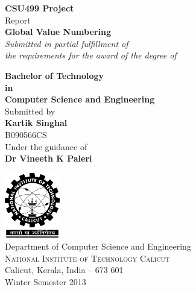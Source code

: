 \begin{titlepage}

\begin{center}

\textup{\small {\bf CSU499 Project} \\ Report}\\[0.4in]

\Large \textbf {Global Value Numbering}\\[0.5in]

       \small \emph{Submitted in partial fulfillment of\\
        the requirements for the award of the degree of}
        \vspace{.2in}

       {\bf Bachelor of Technology \\in\\ Computer Science and Engineering}\\[0.5in]

\normalsize Submitted by \\[0.2in]
\textbf {Kartik Singhal} \\ 
B090566CS\\

\vspace{.3in}
Under the guidance of\\
{\textbf{Dr Vineeth K Paleri}}\\
\vfill


\includegraphics[width=0.18\textwidth]{./nitc-logo}\\[0.2in]
\Large{Department of Computer Science and Engineering}\\
\normalsize
\textsc{National Institute of Technology Calicut}\\
Calicut, Kerala, India -- 673 601 \\
\vspace{0.5cm}
Winter Semester 2013

\end{center}

\end{titlepage}
